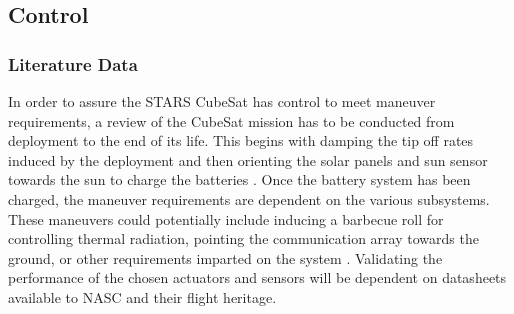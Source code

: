 \subsection{Control}
\subsubsection{Literature Data}
In order to assure the STARS CubeSat has control to meet maneuver requirements, a review of the CubeSat mission has to be conducted from deployment to the end of its life. This begins with damping the tip off rates induced by the deployment and then orienting the solar panels and sun sensor towards the sun to charge the batteries \cite{GNC_Kiss}. Once the battery system has been charged, the maneuver requirements are dependent on the various subsystems. These maneuvers could potentially include inducing a barbecue roll for controlling thermal radiation, pointing the communication array towards the ground, or other requirements imparted on the system \cite{SMAD}. Validating the performance of the chosen actuators and sensors will be dependent on datasheets available to NASC and their flight heritage. 
